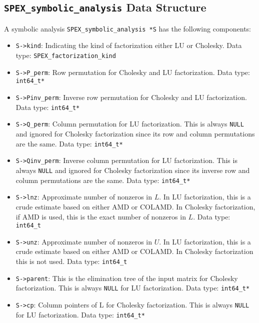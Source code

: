\documentclass[12pt]{report}
\theoremstyle{definition}
\begin{document}
\subsection{\texttt{SPEX\_symbolic\_analysis} Data Structure}
\label{ss:SPEX_symbolic_struct}

A symbolic analysis \verb|SPEX_symbolic_analysis *S| has the following components:

\begin{itemize}
\item \verb|S->kind|: Indicating the kind of factorization either LU or Cholesky. Data type: \verb|SPEX_factorization_kind|

\item \verb|S->P_perm|: Row permutation for Cholesky and LU factorization. Data type: \verb|int64_t*|

\item \verb|S->Pinv_perm|: Inverse row permutation for Cholesky and LU factorization. Data type: \verb|int64_t*|

\item \verb|S->Q_perm|: Column permutation for LU factorization. This is always \verb|NULL| and ignored for Cholesky factorization since its row and column permutations are the same. Data type: \verb|int64_t*|

\item \verb|S->Qinv_perm|: Inverse column permutation for LU factorization. This is always \verb|NULL| and ignored for Cholesky factorization since its inverse row and column permutations are the same. Data type: \verb|int64_t*|

\item \verb|S->lnz|: Approximate number of nonzeros in $L$. In LU factorization, this is a crude estimate based on either AMD or COLAMD. In Cholesky factorization, if AMD is used, this is the exact number of nonzeros in $L$. Data type: \verb|int64_t|

\item \verb|S->unz|: Approximate number of nonzeros in $U$. In LU factorization, this is a crude estimate based on either AMD or COLAMD. In Cholesky factorization this is not used. Data type: \verb|int64_t|

\item \verb|S->parent|: This is the elimination tree of the input matrix for Cholesky factorization. This is always \verb|NULL| for LU factorization. Data type: \verb|int64_t*|

\item \verb|S->cp|: Column pointers of L for Cholesky factorization. This is always \verb|NULL| for LU factorization. Data type: \verb|int64_t*|
\end{itemize}
\end{document}
